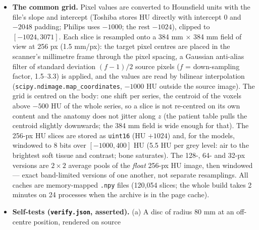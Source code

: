 \documentclass[11pt]{article}
\begin{document}
\begin{itemize}
        dropped; slices are sorted by $z$ and duplicate positions
        ($|\Delta z| < 10^{-3}$ mm) removed. The $z$ spacing of a series
        (median $\Delta z$) ranges from 0.45 to 5 mm, and consecutive
        0.6-mm slices are near-copies, so slices are selected greedily with
        a stride of at least 2.5 mm along $z$ (thin series contribute every
        fourth slice, 2.5-mm series every slice); series with fewer than 20
        slices would be rejected (none is). The split is by \emph{subject}
        (seeded 80/10/10), never by slice, so that no test slice has a
        neighbour 2.5 mm away in the training set.
  \item \textbf{The common grid.} Pixel values are converted to Hounsfield
        units with the file's slope and intercept (Toshiba stores HU directly
        with intercept 0 and $-2048$ padding; Philips uses $-1000$; the rest
        $-1024$), clipped to $[-1024, 3071]$. Each slice is resampled onto a
        384 mm $\times$ 384 mm field of view at 256 px (1.5 mm/px): the
        target pixel centres are placed in the scanner's millimetre frame
        through the pixel spacing, a Gaussian anti-alias filter of standard
        deviation $(f-1)/2$ source pixels ($f$ = down-sampling factor,
        1.5--3.3) is applied, and the values are read by bilinear
        interpolation (\texttt{scipy.ndimage.map\_coordinates}, $-1000$ HU
        outside the source image). The grid is centred on the body: one
        shift per series, the centroid of the voxels above $-500$ HU of the
        whole series, so a slice is not re-centred on its own content and
        the anatomy does not jitter along $z$ (the patient table pulls the
        centroid slightly downwards; the 384 mm field is wide enough for
        that). The 256-px HU slices are stored as \texttt{uint16} (HU $+
        1024$) and, for the models, windowed to 8 bits over $[-1000, 400]$
        HU (5.5 HU per grey level: air to the brightest soft tissue and
        contrast; bone saturates). The 128-, 64- and 32-px versions are $2
        \times 2$ average pools of the \emph{float} 256-px HU image, then
        windowed --- exact band-limited versions of one another, not
        separate resamplings. All caches are memory-mapped \texttt{.npy}
        files (120,054 slices; the whole build takes 2 minutes on 24
        processes when the archive is in the page cache).
  \item \textbf{Self-tests (\texttt{verify.json}, asserted).} (a) A disc
        of radius 80 mm at an off-centre position, rendered on source

\end{itemize}
\end{document}
